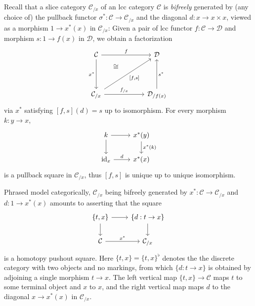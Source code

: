 \documentclass{article}
\theoremstyle{remark}
\theoremstyle{definition}
\begin{document}
Recall that a slice category $\mathcal{C}_{/ x}$ of an lcc category $\mathcal{C}$ is \emph{bifreely} generated by (any choice of) the pullback functor $\sigma^* : \mathcal{C} \rightarrow \mathcal{C}_{/ x}$ and the diagonal $d : x \rightarrow x \times x$, viewed as a morphism $1 \rightarrow x^*(x)$ in $\mathcal{C}_{/ x}$:
Given a pair of lcc functor $f : \mathcal{C} \rightarrow \mathcal{D}$ and morphism $s : 1 \rightarrow f(x)$ in $\mathcal{D}$, we obtain a factorization
\begin{equation}
  \begin{tikzcd}
    \mathcal{C} \arrow[rr, "f"] \arrow[dd, "x^*"'] & \, & \mathcal{D} \\
    & & \, \\
    \mathcal{C}_{/ x} \arrow[rr, "f_{/ x}"] \arrow[uur, phantom, "\cong", near end] \arrow[uurr, "{[f, s]}"'] & & \mathcal{D}_{/ f(x)} \arrow[uu, "s^*"']
  \end{tikzcd}
\end{equation}
via $x^*$ satisfying $[f, s](d) = s$ up to isomorphism.
For every morphism $k : y \rightarrow x$,
\begin{equation}
  \begin{tikzcd}
    k \arrow[r] \arrow[d] & x^*(y) \arrow[d, "x^*(k)"] \\
    \mathrm{id}_x \arrow[r, "d"] & x^*(x)
  \end{tikzcd}
\end{equation}
is a pullback square in $\mathcal{C}_{/ x}$, thus $[f, s]$ is unique up to unique isomorphism.

Phrased model categorically, $\mathcal{C}_{/ x}$ being bifreely generated by $x^* : \mathcal{C} \rightarrow \mathcal{C}_{/ x}$ and $d : 1 \rightarrow x^*(x)$ amounts to asserting that the square
\begin{equation}
  \label{eq:homotopy-pushout-lcc}
  \begin{tikzcd}
    \{ t, x \} \arrow[r] \arrow[d] & \{ d : t \rightarrow x \} \arrow[d] \\
    \mathcal{C} \arrow[r, "x^*"] & \mathcal{C}_{/ x}
  \end{tikzcd}
\end{equation}
is a homotopy pushout square.
Here $\{t, x\} = \{t, x\}^\flat$ denotes the the discrete category with two objects and no markings, from which $\{d : t \rightarrow x\}$ is obtained by adjoining a single morphism $t \rightarrow x$.
The left vertical map $\{ t, x \} \rightarrow \mathcal{C}$ maps $t$ to some terminal object and $x$ to $x$, and the right vertical map maps $d$ to the diagonal $x \rightarrow x^*(x)$ in $\mathcal{C}_{/ x}$.
\end{document}
